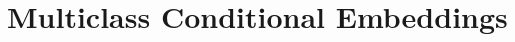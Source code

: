 \documentclass[twoside]{article}
\begin{document}
	

	\section{Multiclass Conditional Embeddings}
	\label{sec:multiclass_conditional_embedding}
	
\end{document}
